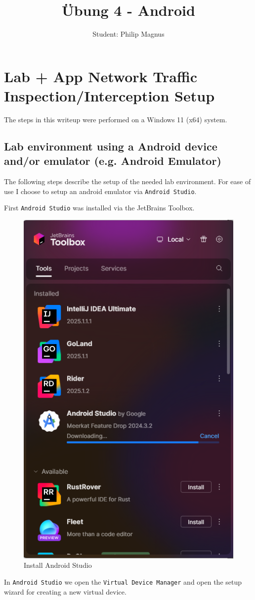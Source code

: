 \documentclass[12pt,a4paper]{article}
\title{Übung 4 - Android}
\author{Student: Philip Magnus}
\date{}
\begin{document}
\maketitle


\section{Lab + App Network Traffic Inspection/Interception Setup}

The steps in this writeup were performed on a Windows 11 (x64) system.

\subsection{Lab environment using a Android device and/or emulator (e.g. Android Emulator)}

The following steps describe the setup of the needed lab environment. For ease of use I choose to setup an android emulator via \texttt{Android Studio}.

First \texttt{Android Studio} was installed via the JetBrains Toolbox.

\begin{figure}[H]
\centering
\includegraphics[width=.4\textwidth]{./screenshots/install_android_studio.png}
\caption{Install Android Studio}
\end{figure}

In \texttt{Android Studio} we open the \texttt{Virtual Device Manager} and open the setup wizard for creating a new virtual device.
\end{document}
